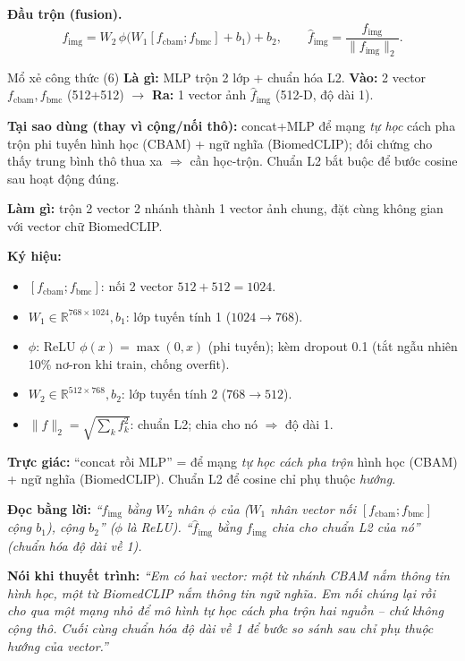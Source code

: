 \documentclass[12pt,a4paper]{article}
\begin{document}
\textbf{Đầu trộn (fusion).}
\begin{equation}
f_{\text{img}}=W_2\,\phi\big(W_1[f_{\text{cbam}};f_{\text{bmc}}]+b_1\big)+b_2,\qquad
\hat f_{\text{img}}=\frac{f_{\text{img}}}{\|f_{\text{img}}\|_2}.
\label{eq:fuse}
\end{equation}
\begin{ctbox}{Mổ xẻ công thức (6)}
\textbf{Là gì:} MLP trộn 2 lớp + chuẩn hóa L2. \quad\textbf{Vào:} 2 vector $f_{\text{cbam}},f_{\text{bmc}}$ (512+512) $\to$ \textbf{Ra:} 1 vector ảnh $\hat f_{\text{img}}$ (512-D, độ dài 1).

\textbf{Tại sao dùng (thay vì cộng/nối thô):} concat+MLP để mạng \emph{tự học} cách pha trộn phi tuyến hình học (CBAM) + ngữ nghĩa (BiomedCLIP); đối chứng cho thấy trung bình thô thua xa $\Rightarrow$ cần học-trộn. Chuẩn L2 bắt buộc để bước cosine sau hoạt động đúng.

\textbf{Làm gì:} trộn 2 vector 2 nhánh thành 1 vector ảnh chung, đặt cùng không gian với vector chữ BiomedCLIP.

\textbf{Ký hiệu:}
\begin{itemize}[leftmargin=1.4em,itemsep=1pt]
\item $[f_{\text{cbam}};f_{\text{bmc}}]$: nối 2 vector $512{+}512{=}1024$.
\item $W_1\in\mathbb{R}^{768\times1024},b_1$: lớp tuyến tính 1 ($1024\to768$).
\item $\phi$: ReLU $\phi(x)=\max(0,x)$ (phi tuyến); kèm dropout 0.1 (tắt ngẫu nhiên 10\% nơ-ron khi train, chống overfit).
\item $W_2\in\mathbb{R}^{512\times768},b_2$: lớp tuyến tính 2 ($768\to512$).
\item $\|f\|_2=\sqrt{\sum_k f_k^2}$: chuẩn L2; chia cho nó $\Rightarrow$ độ dài 1.
\end{itemize}
\textbf{Trực giác:} ``concat rồi MLP'' = để mạng \emph{tự học cách pha trộn} hình học (CBAM) + ngữ nghĩa (BiomedCLIP). Chuẩn L2 để cosine chỉ phụ thuộc \emph{hướng}.

\textbf{Đọc bằng lời:} \emph{``$f_{\text{img}}$ bằng $W_2$ nhân $\phi$ của ($W_1$ nhân vector nối $[f_{\text{cbam}};f_{\text{bmc}}]$ cộng $b_1$), cộng $b_2$'' ($\phi$ là ReLU). ``$\hat f_{\text{img}}$ bằng $f_{\text{img}}$ chia cho chuẩn L2 của nó'' (chuẩn hóa độ dài về 1).}

\textbf{Nói khi thuyết trình:} \emph{``Em có hai vector: một từ nhánh CBAM nắm thông tin hình học, một từ BiomedCLIP nắm thông tin ngữ nghĩa. Em nối chúng lại rồi cho qua một mạng nhỏ để mô hình tự học cách pha trộn hai nguồn -- chứ không cộng thô. Cuối cùng chuẩn hóa độ dài về 1 để bước so sánh sau chỉ phụ thuộc hướng của vector.''}
\end{ctbox}
\end{document}
